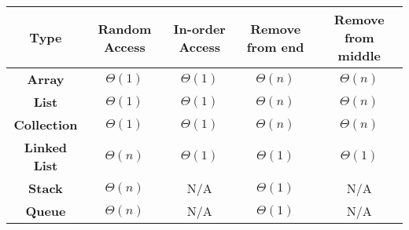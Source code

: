 \documentclass[12pt,american]{article}
\providecommand{\tabularnewline}{\\}
\providecommand{\tabularnewline}{\\}
\begin{document}
\begin{center}
	{\small{}\smallskip{}
	}{\small\par}
	\par\end{center}

\begin{center}
	\begin{tabular}{|c|c|c|c|c|}
		\hline
		\textbf{\small{}Type}        & \textbf{\small{}Random Access} & \textbf{\small{}In-order Access} & \textbf{\small{}Remove from end} & \textbf{\small{}Remove from middle}\tabularnewline
		\hline
		\hline
		\textbf{\small{}Array}       & {\small{}$\Theta(1)$}          & {\small{}$\Theta(1)$}            & {\small{}$\Theta(n)$}            & {\small{}$\Theta(n)$}\tabularnewline
		\hline
		\textbf{\small{}List}        & {\small{}$\Theta(1)$}          & {\small{}$\Theta(1)$}            & {\small{}$\Theta(n)$}            & {\small{}$\Theta(n)$}\tabularnewline
		\hline
		\textbf{\small{}Collection}  & {\small{}$\Theta(1)$}          & {\small{}$\Theta(1)$}            & {\small{}$\Theta(n)$}            & {\small{}$\Theta(n)$}\tabularnewline
		\hline
		\textbf{\small{}Linked List} & {\small{}$\Theta(n)$}          & {\small{}$\Theta(1)$}            & {\small{}$\Theta(1)$}            & {\small{}$\Theta(1)$}\tabularnewline
		\hline
		\textbf{\small{}Stack}       & {\small{}$\Theta(n)$}          & {\small{}N/A}                    & {\small{}$\Theta(1)$}            & {\small{}N/A}\tabularnewline
		\hline
		\textbf{\small{}Queue}       & {\small{}$\Theta(n)$}          & {\small{}N/A }                   & {\small{}$\Theta(1)$}            & {\small{}N/A}\tabularnewline
		\hline
	\end{tabular}
	\par\end{center}

\begin{center}
	\vfill{}
	\par\end{center}
\end{document}
